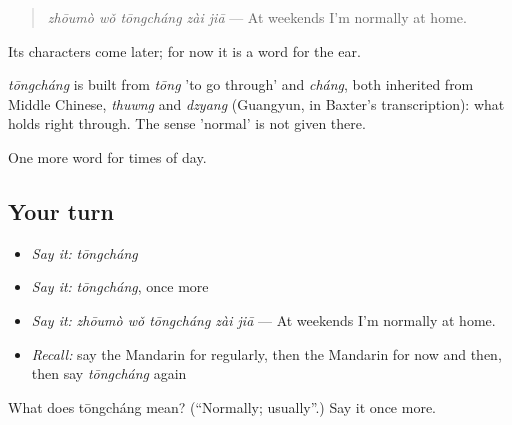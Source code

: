 \begin{quote}
\emph{zhōumò wǒ tōngcháng zài jiā} — At weekends I'm normally at home.
\end{quote}

Its characters come later; for now it is a word for the ear.

\begin{cousinweb}
\emph{tōngcháng} is built from \emph{tōng} 'to go through' and \emph{cháng}, both inherited from Middle Chinese, \emph{thuwng} and \emph{dzyang} (Guangyun, in Baxter's transcription): what holds right through. The sense 'normal' is not given there.
\end{cousinweb}

\begin{grammarlens}[title={What you've built}]
One more word for times of day.
\end{grammarlens}

\subsection*{Your turn}
\begin{itemize}
\raggedright
  \item \emph{Say it:} \emph{tōngcháng}
  \item \emph{Say it:} \emph{tōngcháng}, once more
  \item \emph{Say it:} \emph{zhōumò wǒ tōngcháng zài jiā} — At weekends I'm normally at home.
  \item \emph{Recall:} say the Mandarin for regularly, then the Mandarin for now and then, then say \emph{tōngcháng} again
\end{itemize}

\begin{tcolorbox}[breakable,colback=teal!4,colframe=teal!35!black,title={Before you move on}]
What does tōngcháng mean? (\textquotedblleft{}Normally; usually\textquotedblright{}.) Say it once more.
\end{tcolorbox}
